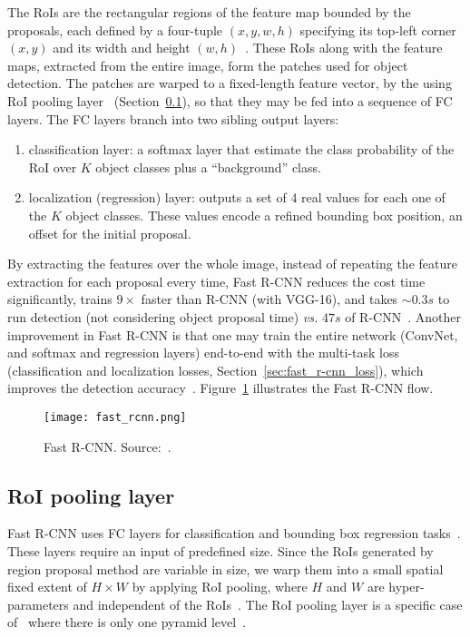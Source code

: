 The RoIs are the rectangular regions of the feature map bounded by the proposals,
each defined by a four-tuple $(x, y, w, h)$ specifying its top-left corner $(x, y)$ and its width and height $(w, h)$~\cite{Girshick2015}.
These RoIs along with the feature maps, extracted from the entire image, form the patches used for object detection.
The patches are warped to a fixed-length feature vector, by the using RoI pooling layer~\cite{Girshick2015} (Section~\ref{sec:roi_pool}), so that they may be fed into a sequence of FC layers.
The FC layers branch into two sibling output layers:
%
%
\begin{enumerate}
 \item classification layer: a softmax layer that estimate the class probability of the RoI over $K$ object classes plus a ``background'' class.
 \item localization (regression) layer: outputs a set of 4 real values for each one of the $K$ object classes.
 These values encode a refined bounding box position, \ie an offset for the initial proposal.
\end{enumerate}

By extracting the features over the whole image, instead of repeating the feature extraction for each proposal every time,
Fast R-CNN reduces the cost time significantly,
trains $9\times$ faster than R-CNN (with VGG-16),
and takes $\sim0.3s$ to run detection (not considering object proposal time) {\it vs.} $47s$ of R-CNN~\cite{Girshick2015}.
Another improvement in Fast R-CNN is that one may train the entire network (ConvNet, and softmax and regression layers) end-to-end with the multi-task loss (classification and localization losses, Section~\ref{sec:fast_r-cnn_loss}), which improves the detection accuracy~\cite{Girshick2015}.
Figure~\ref{fig:Fast R-CNN} illustrates the Fast R-CNN flow.
%
%
\begin{figure}[th!]
	\centering
	\texttt{[image: fast\_rcnn.png]}
	\caption[Fast R-CNN]{Fast R-CNN. Source:~\cite{Girshick2015}.
	}
	\label{fig:Fast R-CNN}
\end{figure}


\subsection{RoI pooling layer}\label{sec:roi_pool}
%
Fast R-CNN uses FC layers for classification and bounding box regression tasks~\cite{Girshick2015}.
These layers require an input of predefined size.
Since the RoIs generated by region proposal method are variable in size, we warp them into a small spatial fixed extent of $H\times W$ by applying RoI pooling, where $H$ and $W$ are hyper-parameters and independent of the RoIs~\cite{Girshick2015}.
The RoI pooling layer is a specific case of~\cite{He2014SPP} where there is only one pyramid level~\cite{Girshick2015}.


